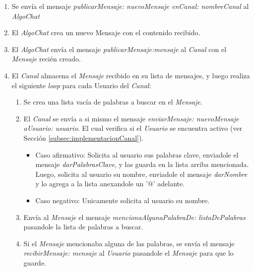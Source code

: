 \documentclass[titlepage,a4paper]{article}
\begin{document}
\begin{enumerate}
	\item Se envía el mensaje \textit{publicarMensaje: nuevoMensaje enCanal: nombreCanal} al \textit{AlgoChat}
	\item El \textit{AlgoChat} crea un nuevo Mensaje con el contenido recibido.
	\item El \textit{AlgoChat} envía el mensaje \textit{publicarMensaje:mensaje} al \textit{Canal} con el \textit{Mensaje} recién creado.
	\item El \textit{Canal} almacena el \textit{Mensaje} recibido en su lista de mensajes, y luego realiza el siguiente \textit{loop} para cada Usuario del \textit{Canal}:
	\begin{enumerate}
		\item Se crea una lista vacía de palabras a buscar en el \textit{Mensaje}.
		\item El \textit{Canal} se envía a si mismo el mensaje \textit{enviarMensaje: nuevoMensaje aUsuario: usuario}. El cual verifica si el \textit{Usuario} se encuentra activo (ver Sección \ref{subsec:implementacionCanal}).
		\begin{itemize}
			\item Caso afirmativo: Solicita al usuario sus palabras clave, enviadole el mensaje \textit{darPalabrasClave}, y las guarda en la lista arriba mencionada. Luego, solicita al usuario su nombre, enviadole el mensaje \textit{darNombre} y lo agrega a la lista anexandole un '@' adelante.
			\item Caso negativo: Unicamente solicita al usuario su nombre.
		\end{itemize}
		\item Envía al \textit{Mensaje} el mensaje \textit{mencionaAlgunaPalabraDe: listaDePalabras} pasandole la lista de palabras a buscar.
		\item Si el \textit{Mensaje} mencionaba alguna de las palabras, se envía el mensaje \textit{recibirMensaje: mensaje} al \textit{Usuario} pasandole el \textit{Mensaje} para que lo guarde.
	\end{enumerate}
\end{enumerate}
\end{document}
